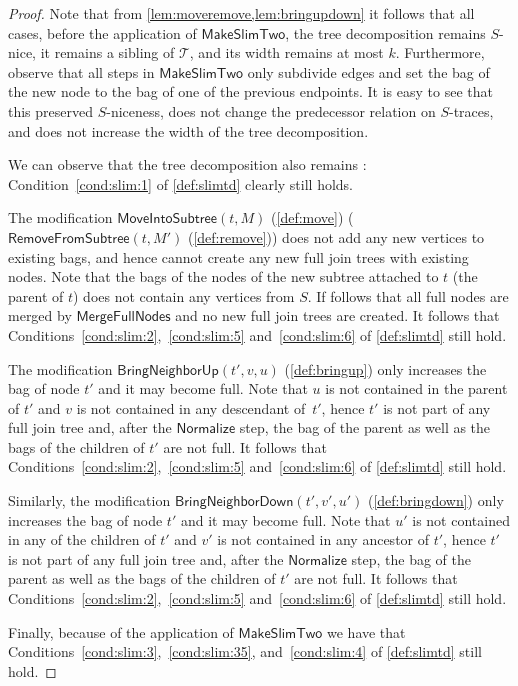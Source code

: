 \documentclass[a4paper,UKenglish,cleveref, autoref, thm-restate, numberwithinsect]{lipics-v2021}
\newcounter{modification}
\newcommand{\slim}{\text{slim}\xspace}
\newcommand{\Normalize}{\mathsf{Normalize}}
\newcommand{\MoveIntoSubtree}{\mathsf{MoveIntoSubtree}}
\newcommand{\RemoveFromSubtree}{\mathsf{RemoveFromSubtree}}
\newcommand{\MergeFullNodes}{\mathsf{MergeFullNodes}}
\newcommand{\BringNeighborUp}{\mathsf{BringNeighborUp}}
\newcommand{\BringNeighborDown}{\mathsf{BringNeighborDown}}
\newcommand{\MakeSlimTwo}{\mathsf{MakeSlimTwo}}
\begin{document}
\begin{proof}
Note that from \cref{lem:moveremove,lem:bringupdown} it follows that all cases, before the application of $\MakeSlimTwo$, the tree decomposition remains $S$-nice, it remains a sibling of $\mathcal{T}$, and its width remains at most $k$. 
Furthermore, observe that all steps in $\MakeSlimTwo$ only subdivide edges and set the bag of the new node to the bag of one of the previous endpoints. It is easy to see that this preserved $S$-niceness, does not change the predecessor relation on $S$-traces, and does not increase the width of the tree decomposition.

We can observe that the tree decomposition also remains \slim: Condition~\ref{cond:slim:1} of \cref{def:slimtd} clearly still holds.

The modification $\MoveIntoSubtree(t,M)$ (\cref{def:move}) ($\RemoveFromSubtree(t,M')$ (\cref{def:remove})) does not add any new vertices to existing bags, and hence cannot create any new full join trees with existing nodes. Note that the bags of the nodes of the new subtree attached to $t$ (the parent of $t$) does not contain any vertices from $S$. If follows that all full nodes are merged by $\MergeFullNodes$ and no new full join trees are created.
It follows that Conditions~\ref{cond:slim:2},~\ref{cond:slim:5} and~\ref{cond:slim:6} of \cref{def:slimtd} still hold.

The modification $\BringNeighborUp(t', v, u)$ (\cref{def:bringup}) only increases the bag of node $t'$ and it may become full. Note that $u$ is not contained in the parent of $t'$ and $v$ is not contained in any descendant of~$t'$, hence $t'$ is not part of any full join tree and, after the $\Normalize$ step, the bag of the parent as well as the bags of the children of $t'$ are not full.
It follows that Conditions~\ref{cond:slim:2},~\ref{cond:slim:5} and~\ref{cond:slim:6} of \cref{def:slimtd} still hold.

Similarly, the modification $\BringNeighborDown(t', v', u')$ (\cref{def:bringdown}) only increases the bag of node $t'$ and it may become full. Note that $u'$ is not contained in any of the children of $t'$ and $v'$ is not contained in any ancestor of $t'$, hence $t'$ is not part of any full join tree and, after the $\Normalize$ step, the bag of the parent as well as the bags of the children of $t'$ are not full.
It follows that Conditions~\ref{cond:slim:2},~\ref{cond:slim:5} and~\ref{cond:slim:6} of \cref{def:slimtd} still hold.

Finally, because of the application of $\MakeSlimTwo$ we have that Conditions~\ref{cond:slim:3},~\ref{cond:slim:35}, and~\ref{cond:slim:4} of \cref{def:slimtd} still hold. 
\end{proof}
\end{document}
